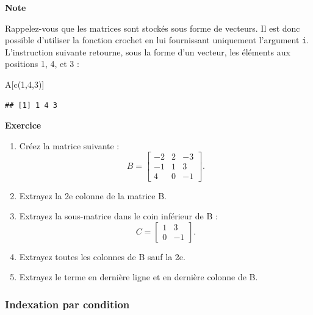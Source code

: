 \documentclass[
  11pt,
]{book}
\newenvironment{Shaded}{\begin{snugshade}}{\end{snugshade}}
\newcommand{\DecValTok}[1]{\textcolor[rgb]{0.00,0.00,0.81}{#1}}
\newcommand{\FunctionTok}[1]{\textcolor[rgb]{0.00,0.00,0.00}{#1}}
\newcommand{\NormalTok}[1]{#1}
\providecommand{\tightlist}{%
  \setlength{\itemsep}{0pt}\setlength{\parskip}{0pt}}
\numberwithin{equation}{section}
\numberwithin{countremarque}{section}
\newenvironment{notebox}{
  \begin{tcolorbox}[breakable, colback=jaune,coltext=black,
                  colframe=grisfonce]}
 {\end{tcolorbox}}
\newenvironment{greenbox}{
  \begin{tcolorbox}[breakable, colback=vert,coltext=black,
                  colframe=grisfonce]}
 {\end{tcolorbox}}
\begin{document}
\begin{notebox}

\textbf{Note}

Rappelez-vous que les matrices sont stockés sous forme de vecteurs. Il est donc possible d'utiliser la fonction crochet en lui fournissant uniquement l'argument \texttt{i}. L'instruction suivante retourne, sous la forme d'un vecteur, les éléments aux positions 1, 4, et 3 :

\begin{Shaded}
\begin{Highlighting}[]
\NormalTok{A[}\FunctionTok{c}\NormalTok{(}\DecValTok{1}\NormalTok{,}\DecValTok{4}\NormalTok{,}\DecValTok{3}\NormalTok{)]}
\end{Highlighting}
\end{Shaded}

\begin{lstlisting}
## [1] 1 4 3
\end{lstlisting}

\end{notebox}

\begin{greenbox}

\textbf{Exercice}

\begin{enumerate}
\def\labelenumi{\arabic{enumi}.}
\tightlist
\item
  Créez la matrice suivante : \[B = \begin{bmatrix}-2 & 2 & -3 \\ -1 & 1 & 3\\4 & 0 & -1\end{bmatrix}.\]
\item
  Extrayez la 2e colonne de la matrice B.
\item
  Extrayez la sous-matrice dans le coin inférieur de B : \[C=\begin{bmatrix}1 & 3 \\ 0 & -1\end{bmatrix}.\]
\item
  Extrayez toutes les colonnes de B sauf la 2e.
\item
  Extrayez le terme en dernière ligne et en dernière colonne de B.
\end{enumerate}

\end{greenbox}

\hypertarget{indexation-par-condition-1}{%
\subsubsection{Indexation par condition}\label{indexation-par-condition-1}}
\end{document}
